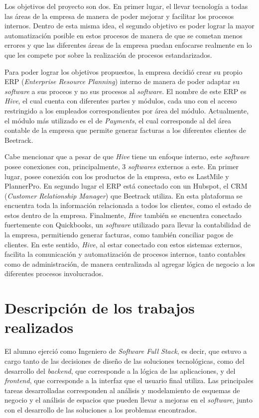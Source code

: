     Los objetivos del proyecto son dos. En primer lugar, el llevar tecnología a todas las áreas de la empresa de manera de poder mejorar y facilitar los procesos internos. Dentro de esta misma idea, el segundo objetivo es poder lograr la mayor automatización posible en estos procesos de manera de que se cometan menos errores y que las diferentes áreas de la empresa puedan enfocarse realmente en lo que les compete por sobre la realización de procesos estandarizados.
    
    Para poder lograr los objetivos propuestos, la empresa decidió crear su propio ERP (\textit{Enterprise Resource Planning}) interno de manera de poder adaptar su \textit{software} a sus proceos y no sus procesos al \textit{software}. El nombre de este ERP es \textit{Hive}, el cual cuenta con diferentes partes y módulos, cada uno con el acceso restringido a los empleados correspondientes por área del módulo. Actualmente, el módulo más utilizado es el de \textit{Payments}, el cual corresponde al del área contable de la empresa que permite generar facturas a los diferentes clientes de Beetrack.
    
    Cabe mencionar que a pesar de que \textit{Hive} tiene un enfoque interno, este \textit{software} posee conexiones con, principalmente, 3 \textit{softwares} externos a este. En primer lugar, posee conexión con los productos de la empresa, esto es LastMile y PlannerPro. En segundo lugar el ERP está conectado con un Hubspot, el CRM (\textit{Customer Relationship Manager}) que Beetrack utiliza. En esta plataforma se encuentra toda la información relacionada a todos los clientes, como el estado de estos dentro de la empresa. Finalmente, \textit{Hive} también se encuentra conectado fuertemente con Quickbooks, un \textit{software} utilizado para llevar la contabilidad de la empresa, permitiendo generar facturas, como también conciliar pagos de clientes. En este sentido, \textit{Hive}, al estar conectado con estos sistemas externos, facilita la comunicación y automatización de procesos internos, tanto contables como de administración, de manera centralizada al agregar lógica de negocio a los diferentes procesos involucrados.


\section{Descripción de los trabajos realizados}

    El alumno ejerció como Ingeniero de \textit{Software Full Stack}, es decir, que estuvo a cargo tanto de las decisiones de diseño de las soluciones tecnológicas, como del desarrollo del \textit{backend}, que corresponde a la lógica de las aplicaciones, y del \textit{frontend}, que corresponde a la interfaz que el usuario final utiliza. Las principales tareas desarrolladas corresponden al análisis y modelamiento de esquemas de negocio y el análisis de espacios que pueden llevar a mejoras en el \textit{software}, junto con el desarrollo de las soluciones a los problemas encontrados.
    
